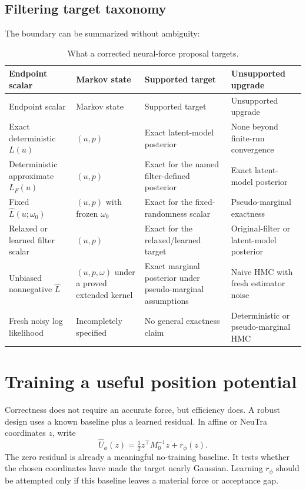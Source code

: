 \subsection{Filtering target taxonomy}

The boundary can be summarized without ambiguity:
{\small
\begin{longtable}{@{}p{}p{}p{}p{}@{}}
\caption{What a corrected neural-force proposal targets.}
\label{tab:bf-hnn-filtering-boundary}\\
\toprule
Endpoint scalar & Markov state & Supported target & Unsupported upgrade \\
\midrule
\endfirsthead
\toprule
Endpoint scalar & Markov state & Supported target & Unsupported upgrade \\
\midrule
\endhead
Exact deterministic $L(u)$ & $(u,p)$ & Exact latent-model posterior & None beyond finite-run convergence \\
Deterministic approximate $L_F(u)$ & $(u,p)$ & Exact for the named filter-defined posterior & Exact latent-model posterior \\
Fixed $\widehat L(u;\omega_0)$ & $(u,p)$ with frozen $\omega_0$ & Exact for the fixed-randomness scalar & Pseudo-marginal exactness \\
Relaxed or learned filter scalar & $(u,p)$ & Exact for the relaxed/learned target & Original-filter or latent-model posterior \\
Unbiased nonnegative $\widehat L$ & $(u,p,\omega)$ under a proved extended kernel & Exact marginal posterior under pseudo-marginal assumptions & Naive HMC with fresh estimator noise \\
Fresh noisy log likelihood & Incompletely specified & No general exactness claim & Deterministic or pseudo-marginal HMC \\
\bottomrule
\end{longtable}
}

\section{Training a useful position potential}
\label{sec:bf-hnn-training}

Correctness does not require an accurate force, but efficiency does.  A robust
design uses a known baseline plus a learned residual.  In affine or NeuTra
coordinates $z$, write
\begin{equation}
 \widehat U_\phi(z)=\tfrac12z^\top M_0^{-1}z+r_\phi(z).
 \label{eq:bf-hnn-residual-potential}
\end{equation}
The zero residual is already a meaningful no-training baseline.  It tests
whether the chosen coordinates have made the target nearly Gaussian.  Learning
$r_\phi$ should be attempted only if this baseline leaves a material force or
acceptance gap.

